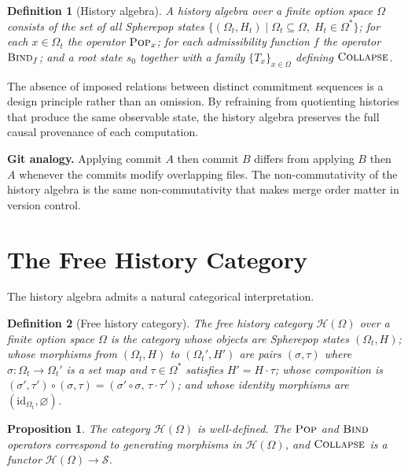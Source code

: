 \documentclass[12pt]{article}
\newtheorem{definition}{Definition}[section]
\newtheorem{proposition}{Proposition}[section]
\newcommand{\Pop}{\operatorname{\textsc{Pop}}}
\newcommand{\Bind}{\operatorname{\textsc{Bind}}}
\newcommand{\Collapse}{\operatorname{\textsc{Collapse}}}
\newcommand{\History}{\mathcal{H}}
\newcommand{\Option}{\Omega}
\newcommand{\State}{\mathcal{S}}
\newcommand{\Append}{\mathbin{\cdot}}
\begin{document}
\begin{definition}[History algebra]
\label{def:histalg}
A \emph{history algebra} over a finite option space $\Option$ consists of the set of all Spherepop states $\{(\Option_t, H_t) \mid \Option_t \subseteq \Option,\; H_t \in \Option^*\}$; for each $x \in \Option_t$ the operator $\Pop_x$; for each admissibility function $f$ the operator $\Bind_f$; and a root state $s_0$ together with a family $\{T_x\}_{x\in\Option}$ defining $\Collapse$.
\end{definition}

The absence of imposed relations between distinct commitment sequences is a design principle rather than an omission. By refraining from quotienting histories that produce the same observable state, the history algebra preserves the full causal provenance of each computation.

\medskip\noindent\textbf{Git analogy.} Applying commit $A$ then commit $B$ differs from applying $B$ then $A$ whenever the commits modify overlapping files. The non-commutativity of the history algebra is the same non-commutativity that makes merge order matter in version control.\medskip

\section{The Free History Category}
\label{sec:historycategory}

The history algebra admits a natural categorical interpretation.

\begin{definition}[Free history category]
\label{def:freehist}
The \emph{free history category} $\History(\Option)$ over a finite option space $\Option$ is the category whose objects are Spherepop states $(\Option_t, H)$; whose morphisms from $(\Option_t, H)$ to $(\Option_t', H')$ are pairs $(\sigma, \tau)$ where $\sigma : \Option_t \to \Option_t'$ is a set map and $\tau \in \Option^*$ satisfies $H' = H \Append \tau$; whose composition is $(\sigma', \tau') \circ (\sigma, \tau) = (\sigma' \circ \sigma,\, \tau \Append \tau')$; and whose identity morphisms are $(\mathrm{id}_{\Option_t}, \varnothing)$.
\end{definition}

\begin{proposition}
The category $\History(\Option)$ is well-defined. The $\Pop$ and $\Bind$ operators correspond to generating morphisms in $\History(\Option)$, and $\Collapse$ is a functor $\History(\Option) \to \State$.
\end{proposition}
\end{document}
